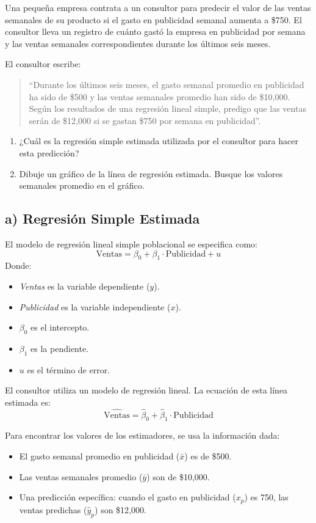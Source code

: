 \documentclass[12pt]{article}
\begin{document}
Una pequeña empresa contrata a un consultor para predecir el valor de las ventas semanales de su producto si el gasto en publicidad semanal aumenta a \$750. 
El consultor lleva un registro de cuánto gastó la empresa en publicidad por semana y las ventas semanales correspondientes durante los últimos seis meses. 

El consultor escribe: 
\begin{quote}
``Durante los últimos seis meses, el gasto semanal promedio en publicidad ha sido de \$500 y las ventas semanales promedio han sido de \$10{,}000. 
Según los resultados de una regresión lineal simple, predigo que las ventas serán de \$12{,}000 si se gastan \$750 por semana en publicidad''.
\end{quote}

\begin{enumerate}[label=\alph*)]
    \item ¿Cuál es la regresión simple estimada utilizada por el consultor para hacer esta predicción?
    \item Dibuje un gráfico de la línea de regresión estimada. 
    Busque los valores semanales promedio en el gráfico.
\end{enumerate}

\subsection*{a) Regresión Simple Estimada}

El modelo de regresión lineal simple poblacional se especifica como:
$$
\text{Ventas} = \beta_0 + \beta_1 \cdot \text{Publicidad} + u
$$
Donde:
\begin{itemize}
    \item \textit{Ventas} es la variable dependiente ($y$).
    \item \textit{Publicidad} es la variable independiente ($x$).
    \item $\beta_0$ es el intercepto.
    \item $\beta_1$ es la pendiente.
    \item $u$ es el término de error.
\end{itemize}

El consultor utiliza un modelo de regresión lineal. La ecuación de esta línea estimada es:
$$
\hat{\text{Ventas}} = \hat{\beta}_0 + \hat{\beta}_1 \cdot \text{Publicidad}
$$

Para encontrar los valores de los estimadores, se usa la información dada:
\begin{itemize}
    \item El gasto semanal promedio en publicidad ($\bar{x}$) es de \$500.
    \item Las ventas semanales promedio ($\bar{y}$) son de \$10,000.
    \item Una predicción específica: cuando el gasto en publicidad ($x_p$) es 750, las ventas predichas ($\hat{y}_p$) son \$12,000.
\end{itemize}
\end{document}
